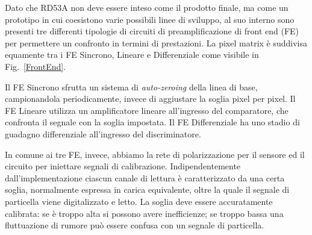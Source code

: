 
Dato che RD53A non deve essere inteso come il prodotto finale, ma come un prototipo in cui coesistono varie possibili linee di sviluppo, al suo interno sono presenti tre differenti tipologie di circuiti di preamplificazione di front end (FE) per permettere un confronto in termini di prestazioni.
La pixel matrix \`e suddivisa equamente tra i FE Sincrono, Lineare e Differenziale come visibile in Fig.~\ref{FrontEnd}. 

Il FE Sincrono sfrutta un sistema di \textit{auto-zeroing} della linea di base, campionandola periodicamente, invece di aggiustare la soglia pixel per pixel. 
Il FE Lineare utilizza un amplificatore lineare all'ingresso del comparatore, che confronta il segnale con la soglia impostata. 
Il FE Differenziale ha uno stadio di guadagno differenziale all'ingresso del discriminatore. %

In comune ai tre FE, invece, abbiamo la rete di polarizzazione per il sensore ed il circuito per iniettare segnali di calibrazione. Indipendentemente dall'implementazione ciascun canale di lettura \`e caratterizzato da una certa soglia, normalmente espressa in carica equivalente, oltre la quale il segnale di particella viene digitalizzato e letto. La soglia deve essere accuratamente calibrata: se \`e troppo alta si possono avere inefficienze; se troppo bassa una fluttuazione di rumore pu\`o essere confusa con un segnale di particella.

